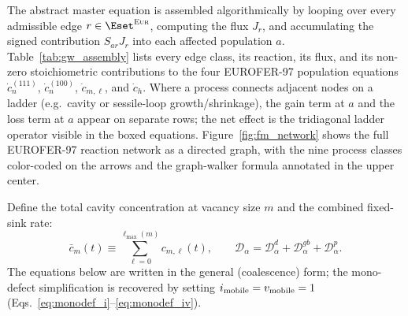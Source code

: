 The abstract master equation is assembled algorithmically by looping over every
admissible edge $r\in\Eset^{\textsc{Eur}}$, computing the flux $J_r$, and
accumulating the signed contribution $S_{ar}J_r$ into each affected population
$a$. Table~\ref{tab:gw_assembly} lists every edge class, its reaction, its flux,
and its non-zero stoichiometric contributions to the four EUROFER-97 population
equations $\dot{c}^{(111)}_n$, $\dot{c}^{(100)}_n$, $\dot{c}_{m,\ell}$, and
$\dot{c}_h$. Where a process connects adjacent nodes on a ladder (e.g.\ cavity
or sessile-loop growth/shrinkage), the gain term at $a$ and the loss term at $a$
appear on separate rows; the net effect is the tridiagonal ladder operator
visible in the boxed equations. Figure~\ref{fig:fm_network} shows the full
EUROFER-97 reaction network as a directed graph, with the nine process classes
color-coded on the arrows and the graph-walker formula annotated in the upper
center.

Define the total cavity concentration at vacancy size $m$ and the combined
fixed-sink rate:
\begin{equation}\label{eq:cbar}
    \bar{c}_m(t) \equiv \sum_{\ell=0}^{\ell_{\max}(m)} c_{m,\ell}(t),
    \qquad
    \mathcal{D}_\alpha
    = \mathcal{D}_\alpha^d + \mathcal{D}_\alpha^{gb}
    + \mathcal{D}_\alpha^p.
\end{equation}
The equations below are written in the general (coalescence) form; the
mono-defect simplification is recovered by setting
$i_{\rm mobile}=v_{\rm mobile}=1$ (Eqs.~\ref{eq:monodef_i}--\ref{eq:monodef_iv}).


